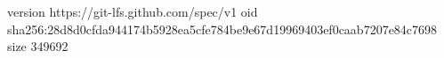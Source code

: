 version https://git-lfs.github.com/spec/v1
oid sha256:28d8d0cfda944174b5928ea5cfe784be9e67d19969403ef0caab7207e84c7698
size 349692
